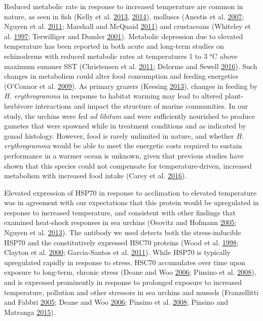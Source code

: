 \documentclass[a4paper,10pt, oneside]{memoir}
\begin{document}
Reduced metabolic rate in response to increased temperature are common in nature, as seen in fish (Kelly et al. \protect\hyperlink{ref-Kelly2013}{2013}, \protect\hyperlink{ref-Kelly2014}{2014}), molluscs (Anestis et al. \protect\hyperlink{ref-Anestis2007}{2007}; Nguyen et al. \protect\hyperlink{ref-Nguyen2011}{2011}; Marshall and McQuaid \protect\hyperlink{ref-Marshall2011}{2011}) and crustaceans (Whiteley et al. \protect\hyperlink{ref-Whiteley1997}{1997}; Terwilliger and Dumler \protect\hyperlink{ref-Terwilliger2001}{2001}).
Metabolic depression due to elevated temperature has been reported in both acute and long-term studies on echinoderms with reduced metabolic rates at temperatures 1 to 3 °C above maximum summer SST (Christensen et al. \protect\hyperlink{ref-Christensen2011}{2011}; Delorme and Sewell \protect\hyperlink{ref-Delorme2016}{2016}).
Such changes in metabolism could alter food consumption and feeding energetics (O'Connor et al. \protect\hyperlink{ref-OConnor2009}{2009}). As primary grazers (Keesing \protect\hyperlink{ref-Keesing2013}{2013}), changes in feeding by \emph{H. erythrogramma} in response to habitat warming may lead to altered plant-herbivore interactions and impact the structure of marine communities.
In our study, the urchins were fed \emph{ad libitum} and were sufficiently nourished to produce gametes that were spawned while in treatment conditions and as indicated by gonad histology.
However, food is rarely unlimited in nature, and whether \emph{H. erythrogramma} would be able to meet the energetic costs required to sustain performance in a warmer ocean is unknown, given that previous studies have shown that this species could not compensate for temperature-driven, increased metabolism with increased food intake (Carey et al. \protect\hyperlink{ref-Carey2016}{2016}).

Elevated expression of HSP70 in response to acclimation to elevated temperature was in agreement with our expectations that this protein would be upregulated in response to increased temperature, and consistent with other findings that examined heat-shock responses in sea urchins (Osovitz and Hofmann \protect\hyperlink{ref-Osovitz2005}{2005}; Nguyen et al. \protect\hyperlink{ref-Nguyen2013}{2013}).
The antibody we used detects both the stress-inducible HSP70 and the constitutively expressed HSC70 proteins (Wood et al. \protect\hyperlink{ref-Wood1998}{1998}; Clayton et al. \protect\hyperlink{ref-Clayton2000}{2000}; Garcia-Santos et al. \protect\hyperlink{ref-Garcia-Santos2011}{2011}).
While HSP70 is typically upregulated rapidly in response to stress, HSC70 accumulates over time upon exposure to long-term, chronic stress (Deane and Woo \protect\hyperlink{ref-Deane2006}{2006}; Pinsino et al. \protect\hyperlink{ref-Pinsino2008}{2008}), and is expressed prominently in response to prolonged exposure to increased temperature, pollution and other stressors in sea urchins and mussels (Franzellitti and Fabbri \protect\hyperlink{ref-Franzellitti2005}{2005}; Deane and Woo \protect\hyperlink{ref-Deane2006}{2006}; Pinsino et al. \protect\hyperlink{ref-Pinsino2008}{2008}; Pinsino and Matranga \protect\hyperlink{ref-Pinsino2015}{2015}).
\end{document}
